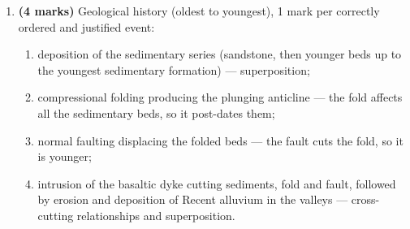 \documentclass[11pt]{article}
\begin{document}
\begin{corrige}
\begin{enumerate}
\begin{itemize}
\item boundaries projected from the map and beds drawn with the dips given by the symbols, symmetric about the fold axis (2 marks);
\item fault drawn as a steep plane with correct downthrown side and offset of boundaries (1 mark);
\item dyke drawn as a near-vertical band cutting all units; formations labelled/ornamented with a key (1 mark).
\end{itemize}
\item \textbf{(4 marks)} Geological history (oldest to youngest), 1 mark per correctly ordered and justified event:
\begin{enumerate}
\item deposition of the sedimentary series (sandstone, then younger beds up to the youngest sedimentary formation) — superposition;
\item compressional folding producing the plunging anticline — the fold affects all the sedimentary beds, so it post-dates them;
\item normal faulting displacing the folded beds — the fault cuts the fold, so it is younger;
\item intrusion of the basaltic dyke cutting sediments, fold and fault, followed by erosion and deposition of Recent alluvium in the valleys — cross-cutting relationships and superposition.
\end{enumerate}
\end{enumerate}
\end{corrige}
\end{document}
